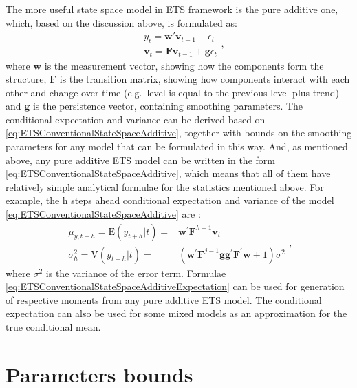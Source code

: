 \documentclass[
]{book}
\theoremstyle{definition}
\theoremstyle{definition}
\theoremstyle{definition}
\theoremstyle{definition}
\theoremstyle{remark}
\begin{document}
The more useful state space model in ETS framework is the pure additive one, which, based on the discussion above, is formulated as:
\begin{equation}
  \begin{aligned}
  & {y}_{t} = \mathbf{w}' \mathbf{v}_{t-1} + \epsilon_t \\
  & \mathbf{v}_{t} = \mathbf{F} \mathbf{v}_{t-1} + \mathbf{g} \epsilon_t
  \end{aligned},
  \label{eq:ETSConventionalStateSpaceAdditive}
\end{equation}
where \(\mathbf{w}\) is the measurement vector, showing how the components form the structure, \(\mathbf{F}\) is the transition matrix, showing how components interact with each other and change over time (e.g.~level is equal to the previous level plus trend) and \(\mathbf{g}\) is the persistence vector, containing smoothing parameters. The conditional expectation and variance can be derived based on \eqref{eq:ETSConventionalStateSpaceAdditive}, together with bounds on the smoothing parameters for any model that can be formulated in this way. And, as mentioned above, any pure additive ETS model can be written in the form \eqref{eq:ETSConventionalStateSpaceAdditive}, which means that all of them have relatively simple analytical formulae for the statistics mentioned above. For example, the h steps ahead conditional expectation and variance of the model \eqref{eq:ETSConventionalStateSpaceAdditive} are \citep[Chapter 6]{Hyndman2008b}:
\begin{equation}
  \begin{aligned}
    \mu_{y,t+h} = \mathrm{E}(y_{t+h}|t) = & \mathbf{w}^\prime \mathbf{F}^{h-1} \mathbf{v}_{t} \\
    \sigma^2_{h} = \mathrm{V}(y_{t+h}|t) = & \left(\mathbf{w}^\prime \mathbf{F}^{j-1} \mathbf{g} \mathbf{g}^\prime \mathbf{F}^\prime \mathbf{w} + 1 \right) \sigma^2
  \end{aligned},
  \label{eq:ETSConventionalStateSpaceAdditiveExpectation}
\end{equation}
where \(\sigma^2\) is the variance of the error term. Formulae \eqref{eq:ETSConventionalStateSpaceAdditiveExpectation} can be used for generation of respective moments from any pure additive ETS model. The conditional expectation can also be used for some mixed models as an approximation for the true conditional mean.

\hypertarget{ETSParametersBounds}{%
\section{Parameters bounds}\label{ETSParametersBounds}}
\end{document}
